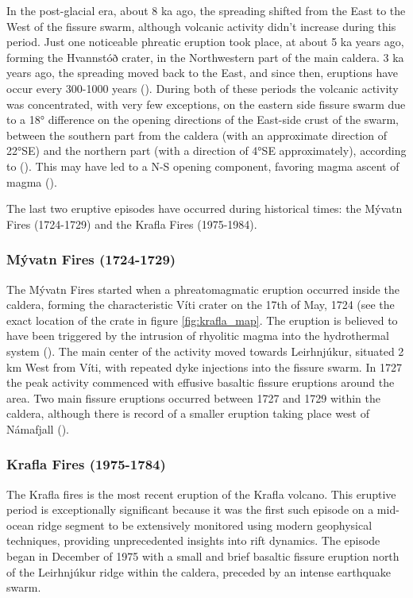 In the post-glacial era, about 8 ka ago, the spreading shifted from the East to the West of the fissure swarm, although volcanic activity didn't increase during this period. Just one noticeable phreatic eruption took place, at about 5 ka years ago, forming the Hvannstóð crater, in the Northwestern part of the main caldera. 3 ka years ago, the spreading moved back to the East, and since then, eruptions have occur every 300-1000 years (\cite{sæmundsson1991}). During both of these periods the volcanic activity was concentrated, with very few exceptions, on the eastern side fissure swarm due to a 18° difference on the opening directions of the East-side crust of the swarm, between the southern part from the caldera (with an approximate direction of 22°SE) and the northern part (with a direction of 4°SE approximately), according to (\cite{drouin2017}). This may have led to a N-S opening component, favoring magma ascent of magma (\cite{arnason2020}).

The last two eruptive episodes have occurred during historical times: the Mývatn Fires (1724-1729) and the Krafla Fires (1975-1984).

\subsubsection{Mývatn Fires (1724-1729)}
The Mývatn Fires started when a phreatomagmatic eruption occurred inside the caldera, forming the characteristic Víti crater on the 17th of May, 1724 (see the exact location of the crate in figure \ref{fig:krafla_map}. The eruption is believed to have been triggered by the intrusion of rhyolitic magma into the hydrothermal system (\cite{montanaro2021}). The main center of the activity moved towards Leirhnjúkur, situated 2 km West from Víti, with repeated dyke injections into the fissure swarm. In 1727 the peak activity commenced with effusive basaltic fissure eruptions around the area. Two main fissure eruptions occurred between 1727 and 1729 within the caldera, although there is record of a smaller eruption taking place west of Námafjall (\cite{sæmundsson1991}).

\subsubsection{Krafla Fires (1975-1784)}
The Krafla fires is the most recent eruption of the Krafla volcano. This eruptive period is exceptionally significant because it was the first such episode on a mid-ocean ridge segment to be extensively monitored using modern geophysical techniques, providing unprecedented insights into rift dynamics. The episode began in December of 1975 with a small and brief basaltic fissure eruption north of the Leirhnjúkur ridge within the caldera, preceded by an intense earthquake swarm.

